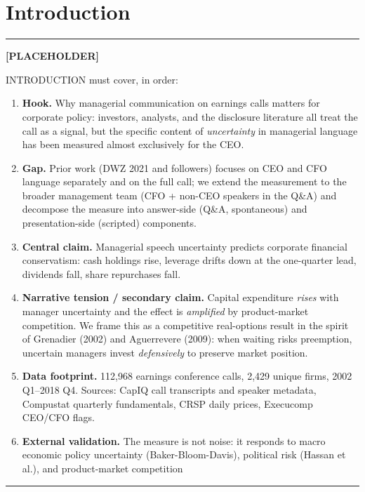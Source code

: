 \documentclass[11pt,a4paper,twocolumn]{article}
\newenvironment{placeholder}{%
  \par\medskip\noindent%
  {\color{placeholderaccent}\rule{\linewidth}{0.4pt}}\par%
  \noindent\textbf{\color{placeholderaccent}[PLACEHOLDER]}\par%
  \smallskip\itshape%
}{%
  \par\upshape\smallskip%
  {\color{placeholderaccent}\rule{\linewidth}{0.4pt}}\par\medskip%
}
\begin{document}
\section{Introduction}
\label{sec:intro}

\begin{placeholder}
INTRODUCTION must cover, in order:
\begin{enumerate}
  \item \textbf{Hook.} Why managerial communication on earnings calls
        matters for corporate policy: investors, analysts, and the
        disclosure literature all treat the call as a signal, but the
        specific content of \emph{uncertainty} in managerial language
        has been measured almost exclusively for the CEO.
  \item \textbf{Gap.} Prior work (DWZ 2021 and followers) focuses on CEO
        and CFO language separately and on the full call; we extend the
        measurement to the broader management team (CFO + non-CEO
        speakers in the Q\&A) and decompose the measure into
        answer-side (Q\&A, spontaneous) and presentation-side
        (scripted) components.
  \item \textbf{Central claim.} Managerial speech uncertainty predicts
        corporate financial conservatism: cash holdings rise, leverage
        drifts down at the one-quarter lead, dividends fall, share
        repurchases fall.
  \item \textbf{Narrative tension / secondary claim.} Capital expenditure
        \emph{rises} with manager uncertainty and the effect is
        \emph{amplified} by product-market competition. We frame this
        as a competitive real-options result in the spirit of
        Grenadier (2002) and Aguerrevere (2009): when waiting risks
        preemption, uncertain managers invest \emph{defensively} to
        preserve market position.
  \item \textbf{Data footprint.} 112{,}968 earnings conference calls,
        2{,}429 unique firms, 2002 Q1--2018 Q4. Sources: CapIQ call
        transcripts and speaker metadata, Compustat quarterly
        fundamentals, CRSP daily prices, Execucomp CEO/CFO flags.
  \item \textbf{External validation.} The measure is not noise: it
        responds to macro economic policy uncertainty (Baker-Bloom-Davis),
        political risk (Hassan et al.), and product-market competition

\end{enumerate}
\end{placeholder}
\end{document}
